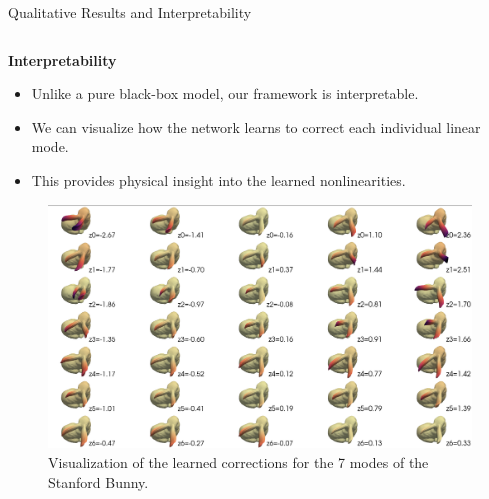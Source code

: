 \documentclass{beamer}
\begin{document}
\begin{frame}{Qualitative Results and Interpretability}
\begin{columns}[T]
        \begin{column}{0.6\textwidth}
            \textbf{Interpretability}
            \begin{itemize}
                \item Unlike a pure black-box model, our framework is interpretable.
                \item We can visualize how the network learns to correct each individual linear mode.
                \item This provides physical insight into the learned nonlinearities.
            \end{itemize}
            \begin{figure}
                \includegraphics[width=\textwidth]{Images/latent_space_viz.png}
                \caption{Visualization of the learned corrections for the 7 modes of the Stanford Bunny.}
            \end{figure}
        \end{column}
    \end{columns}
\end{frame}
\end{document}
